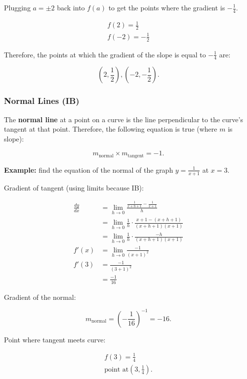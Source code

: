 \documentclass[12pt]{article}
\begin{document}
\begin{enumerate}
    Plugging $a = \pm 2$ back into $f(a)$ to get the points where the gradient is $-\frac{1}{4}$.

    \begin{gather*}
        f(2) = \frac{1}{2} \\
        f(-2) = -\frac{1}{2}
    \end{gather*}

    Therefore, the points at which the gradient of the slope is equal to $-\frac{1}{4}$ are:

    \[ \left( 2, \frac{1}{2} \right), \left( -2, -\frac{1}{2} \right). \]
\end{enumerate}

\subsubsection{Normal Lines (IB)}

The \textbf{normal line} at a point on a curve is the line perpendicular to the curve's tangent at that point. Therefore, the following equation is true (where $m$ is slope):

\[ m_\text{normal} \times m_\text{tangent} = -1. \]

\noindent \textbf{Example:} find the equation of the normal of the graph $y = \frac{1}{x + 1}$ at $x = 3$.

\noindent Gradient of tangent (using limits because IB):

\begin{align*}
    \frac{dy}{dx}  &= \lim_{h \to 0} \frac{\frac{1}{x + h + 1} - \frac{1}{x + 1}}{h} \\[6pt]
    &= \lim_{h \to 0} \frac{1}{h} \cdot \frac{x + 1 - (x + h + 1)}{(x + h + 1)(x + 1)} \\[6pt]
    &= \lim_{h \to 0} \frac{1}{h} \cdot \frac{-h}{(x + h + 1)(x + 1)} \\[6pt]
    f'(x) &= \lim_{h \to 0} \frac{-1}{(x + 1)^2} \\[6pt]
    f'(3) &= \frac{-1}{(3 + 1)^2} \\[6pt]
    &= \frac{-1}{16}
\end{align*}

\noindent Gradient of the normal:

\[ m_\text{normal} = \left( -\frac{1}{16} \right)^{-1} = -16. \]

\noindent Point where tangent meets curve:

\begin{gather*}
    f(3) = \frac{1}{4} \\[6pt]
    \text{point at} \left( 3, \frac{1}{4} \right).
\end{gather*}
\end{document}
